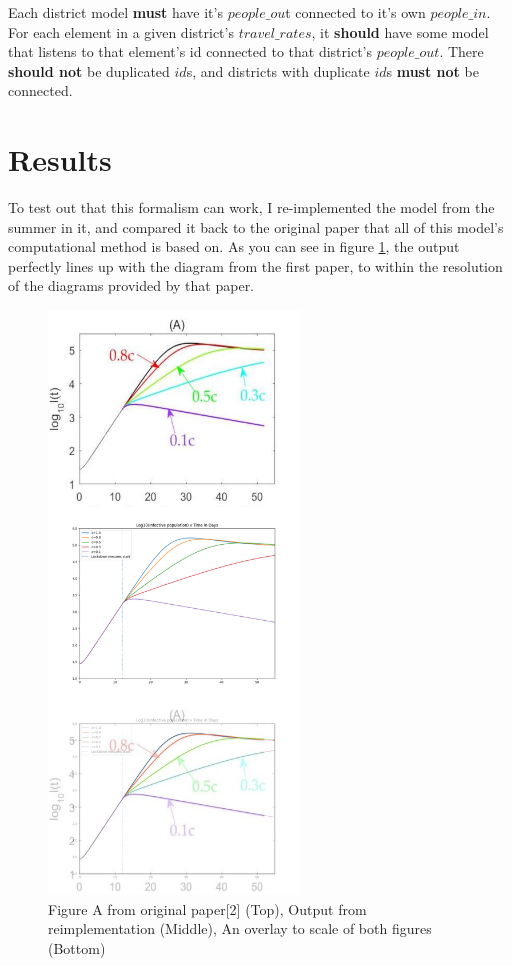 \documentclass[twocolumn]{article}
\begin{document}
Each district model \textbf{must} have it's $people\_ou$t connected to it's own $people\_in$. 
For each element in a given district's $travel\_rates$, it \textbf{should} have some model that listens to that element's id connected to that district's $people\_out$. 
There \textbf{should not} be duplicated $id$s, and districts with duplicate $id$s \textbf{must not} be connected.

\section{Results}
\FloatBarrier

To test out that this formalism can work, I re-implemented the model from the summer in it, and compared it back to the original paper that all of this model's computational method is based on. As you can see in figure \ref{fig:overlay}, the output perfectly lines up with the diagram from the first paper, to within the resolution of the diagrams provided by that paper.

\begin{figure}[!ht]
	\begin{center}
		\includegraphics[width=18em]{figure_a_overlay.png}
		\caption{Figure A from original paper[2] (Top), Output from reimplementation (Middle), An overlay to scale of both figures (Bottom)}
		\label{fig:overlay}
	\end{center}
\end{figure}
\end{document}
